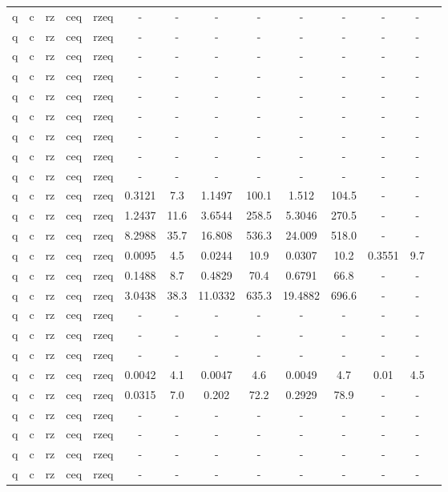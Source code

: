 \begin{table}[htb]
{\begin{tabular}{|c|c|c|c|c|c|c|c|c|c|c|c|c|c|}
q & c & rz & ceq & rzeq & - & - & - & - & - & - & - & - \\ 
q & c & rz & ceq & rzeq & - & - & - & - & - & - & - & - \\ 
q & c & rz & ceq & rzeq & - & - & - & - & - & - & - & - \\ 
q & c & rz & ceq & rzeq & - & - & - & - & - & - & - & - \\ 
q & c & rz & ceq & rzeq & - & - & - & - & - & - & - & - \\ 
q & c & rz & ceq & rzeq & - & - & - & - & - & - & - & - \\ 
q & c & rz & ceq & rzeq & - & - & - & - & - & - & - & - \\ 
q & c & rz & ceq & rzeq & - & - & - & - & - & - & - & - \\ 
q & c & rz & ceq & rzeq & - & - & - & - & - & - & - & - \\ 
q & c & rz & ceq & rzeq & 0.3121 & 7.3 & 1.1497 & 100.1 & 1.512 & 104.5 & - & - \\ 
q & c & rz & ceq & rzeq & 1.2437 & 11.6 & 3.6544 & 258.5 & 5.3046 & 270.5 & - & - \\ 
q & c & rz & ceq & rzeq & 8.2988 & 35.7 & 16.808 & 536.3 & 24.009 & 518.0 & - & - \\ 
q & c & rz & ceq & rzeq & 0.0095 & 4.5 & 0.0244 & 10.9 & 0.0307 & 10.2 & 0.3551 & 9.7 \\ 
q & c & rz & ceq & rzeq & 0.1488 & 8.7 & 0.4829 & 70.4 & 0.6791 & 66.8 & - & - \\ 
q & c & rz & ceq & rzeq & 3.0438 & 38.3 & 11.0332 & 635.3 & 19.4882 & 696.6 & - & - \\ 
q & c & rz & ceq & rzeq & - & - & - & - & - & - & - & - \\ 
q & c & rz & ceq & rzeq & - & - & - & - & - & - & - & - \\ 
q & c & rz & ceq & rzeq & - & - & - & - & - & - & - & - \\ 
q & c & rz & ceq & rzeq & 0.0042 & 4.1 & 0.0047 & 4.6 & 0.0049 & 4.7 & 0.01 & 4.5 \\ 
q & c & rz & ceq & rzeq & 0.0315 & 7.0 & 0.202 & 72.2 & 0.2929 & 78.9 & - & - \\ 
q & c & rz & ceq & rzeq & - & - & - & - & - & - & - & - \\ 
q & c & rz & ceq & rzeq & - & - & - & - & - & - & - & - \\ 
q & c & rz & ceq & rzeq & - & - & - & - & - & - & - & - \\ 
q & c & rz & ceq & rzeq & - & - & - & - & - & - & - & - \\ 

\end{tabular}}
\end{table}
